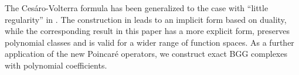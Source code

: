 \documentclass[11pt]{amsart}
\newcommand{\0}{\mathaccent23}
\begin{document}
The Ces\'aro-Volterra formula has been generalized to the case with ``little regularity'' in  \cite{ciarlet2010cesaro}. The construction in \cite{ciarlet2010cesaro} leads to an implicit form based on duality, while the corresponding result in this paper has a more explicit form, preserves polynomial classes and is valid for a wider range of function spaces. As a further application of the new Poincar\'e operators, we construct exact BGG complexes with polynomial coefficients. %


\end{document}

